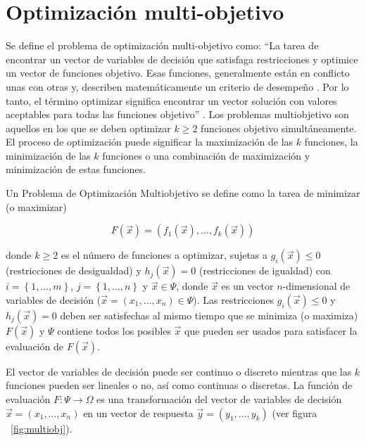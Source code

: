 \section{Optimizaci\'on multi-objetivo}
  
      Se define el problema de optimizaci\'on multi-objetivo como: ``La tarea de encontrar un vector de variables 
      de decisi\'on que satisfaga restricciones y optimice un vector de funciones objetivo. Esas funciones, generalmente est\'an
      en conflicto unas con otras y, describen matem\'aticamente un criterio de desempe\~no . Por lo tanto, el t\'ermino 
      optimizar significa encontrar un vector soluci\'on con valores aceptables para todas las funciones objetivo'' \cite{EASMC85}. 
      Los problemas multiobjetivo son aquellos en los que se deben optimizar $k \geq 2$ funciones objetivo simult\'aneamente. 
      El proceso de optimizaci\'on puede significar la maximizaci\'on de las $k$ funciones, la minimizaci\'on de las $k$ 
      funciones o una combinaci\'on de maximizaci\'on y minimizaci\'on de estas funciones.

      \begin{definicion}
	  Un Problema de Optimizaci\'on Multiobjetivo se define como la tarea de minimizar (o maximizar) 
	  
	  \[F\left(\vec{x}\right)=\left(f_1\left(\vec{x}\right), \ldots,f_k\left(\vec{x}\right) \right)\]
	  
	  donde $k\geq 2$ es el n\'umero de funciones a optimizar, sujetas a $g_i\left(\vec{x}\right) \leq 0 $ (restricciones de 
	  desigualdad) y $h_j\left(\vec{x}\right) = 0 $ (restricciones de igualdad) con $i = \left\{1, \ldots, m \right\}$, $j = \left\{1, \ldots, n \right\}$ 
	  y $\vec{x} \in \Psi $, donde $\vec{x}$ es un vector $n$-dimensional de variables de decisi\'on ($\vec{x} = \left(x_1 , \ldots, x_n \right) \in \Psi$). 
	  Las restricciones $g_i\left(\vec{x}\right) \leq 0$ y $h_j\left(\vec{x}\right) = 0$ deben ser satisfechas 
	  al mismo tiempo que se minimiza (o maximiza) $F\left(\vec{x}\right)$ y $\Psi $ contiene todos los posibles 
	  $\vec{x}$ que pueden ser usados para satisfacer la evaluaci\'on de $F\left(\vec{x}\right)$.

      \end{definicion}

      El vector de variables de decisi\'on puede ser continuo o discreto mientras que las $k$ funciones pueden ser 
      lineales o no, as\'i como continuas o discretas. La funci\'on de evaluaci\'on $F:\Psi \rightarrow \Omega$ es una transformaci\'on 
      del vector de variables de decisi\'on $\vec{x} = \left(x_1 , \ldots, x_n \right)$ en un vector de respuesta 
      $\vec{y} = \left(y_1 , \ldots, y_k \right)$ (ver figura ~\ref{fig:multiobj}).
      
